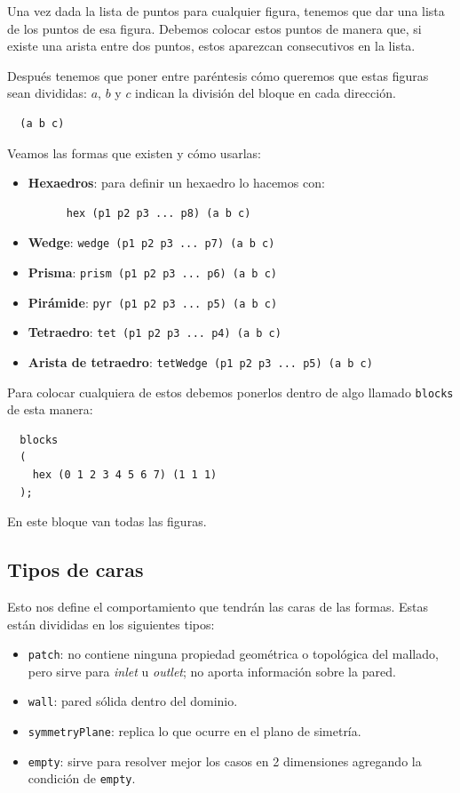 Una vez dada la lista de puntos para cualquier figura, tenemos que dar una lista de los puntos de esa figura. Debemos colocar estos puntos de manera que, si existe una arista entre dos puntos, estos aparezcan consecutivos en la lista.

Después tenemos que poner entre paréntesis cómo queremos que estas figuras sean divididas: $a$, $b$ y $c$ indican la división del bloque en cada dirección.
\begin{verbatim}
  (a b c)
\end{verbatim}

Veamos las formas que existen y cómo usarlas:

\begin{itemize}
  \item \textbf{Hexaedros}: para definir un hexaedro lo hacemos con:
    \begin{verbatim}
      hex (p1 p2 p3 ... p8) (a b c)
    \end{verbatim}

  \item \textbf{Wedge}: \texttt{wedge (p1 p2 p3 ... p7) (a b c)}

  \item \textbf{Prisma}: \texttt{prism (p1 p2 p3 ... p6) (a b c)}

  \item \textbf{Pirámide}: \texttt{pyr (p1 p2 p3 ... p5) (a b c)}

  \item \textbf{Tetraedro}: \texttt{tet (p1 p2 p3 ... p4) (a b c)}

  \item \textbf{Arista de tetraedro}: \texttt{tetWedge (p1 p2 p3 ... p5) (a b c)}
\end{itemize}

Para colocar cualquiera de estos debemos ponerlos dentro de algo llamado \texttt{blocks} de esta manera:
\begin{verbatim}
  blocks
  (
    hex (0 1 2 3 4 5 6 7) (1 1 1)
  );
\end{verbatim}
En este bloque van todas las figuras.

\subsection{Tipos de caras}

Esto nos define el comportamiento que tendrán las caras de las formas. Estas están divididas en los siguientes tipos:
\begin{itemize}
  \item \texttt{patch}: no contiene ninguna propiedad geométrica o topológica del mallado, pero sirve para \textit{inlet} u \textit{outlet}; no aporta información sobre la pared.
  \item \texttt{wall}: pared sólida dentro del dominio.
  \item \texttt{symmetryPlane}: replica lo que ocurre en el plano de simetría.
  \item \texttt{empty}: sirve para resolver mejor los casos en 2 dimensiones agregando la condición de \texttt{empty}.
\end{itemize}

